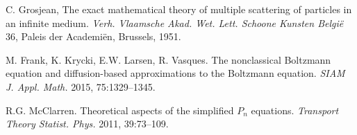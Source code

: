 \documentclass[preprint,12pt]{elsarticle}
\begin{document}
\begin{thebibliography}{00}
\begin{small}
C. Grosjean, The exact mathematical theory of multiple scattering of particles in an infinite medium.
\textit{Verh. Vlaamsche Akad. Wet. Lett. Schoone Kunsten Belgi\" e} 36, Paleis der
Academi\" en, Brussels, 1951.\vspace{-8pt}

M. Frank, K. Krycki, E.W. Larsen, R. Vasques. The nonclassical Boltzmann equation and diffusion-based approximations to the Boltzmann equation. \textit{SIAM J. Appl. Math.} 2015, 75:1329--1345.\vspace{-8pt}

R.G. McClarren. Theoretical aspects of the simplified $P_n$ equations. \textit{Transport Theory Statist. Phys.} 2011, 39:73--109.\vspace{-8pt}








  \end{small}



\end{thebibliography}

\pagebreak
\end{document}
